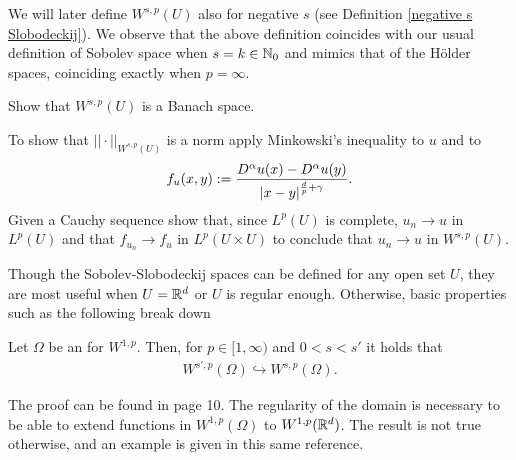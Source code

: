 \documentclass[
    a4paper,
    DIV=14,
    abstract=true,
    numbers=noenddot
]{scrartcl}
\begin{document}
We will later define $W^{s,p}(U)$ also for negative $s$ (see Definition \ref{negative s Slobodeckij}). We observe that the above definition coincides with our usual definition of Sobolev space when $s=k \in \mathbb{N}_0$ and mimics that of the H\"older spaces, coinciding exactly when $p=\infty$.
\begin{exercise}
    Show that $W^{s,p}(U)$ is a Banach space.
\end{exercise}
\begin{hint}
    To show that $|| \cdot ||_{W^{s,p}(U)}$ is a norm apply Minkowski's inequality to $u$ and to
    \begin{align*}
        f_u(x,y):=\frac{D^\alpha u(x)-D^\alpha u(y)}{{\left| x-y \right|}^{\frac{d}{p}+\gamma}}.
    \end{align*}
    Given a Cauchy sequence show that, since $L^p(U)$ is complete, $u_n \to u$ in $L^p(U)$ and that $f_{u_n} \to f_u$ in $L^p(U\times U)$ to conclude that $u_n \to u$ in $W^{s,p}(U)$.
\end{hint}
Though the Sobolev-Slobodeckij spaces can be defined for any open set $U$, they are most useful when $U=\mathbb{R}^d$ or $U$  is regular enough. Otherwise, basic properties such as the following break down
\begin{proposition}\label{inclusion ordered by regularity}
    Let  $\Omega$ be an  for $W^{1,p}$.  Then, for $p \in [1,\infty)$ and $0<s<s'$ it holds that
    \begin{align*}
        W^{s',p}(\Omega )\hookrightarrow W^{s,p}(\Omega ).
    \end{align*}
\end{proposition}
The proof can be found in \cite{di2012hitchhikers} page 10. The regularity of the domain is necessary to be able to extend functions in $W^{1,p}(\Omega )$ to $W^{1,p}(\mathbb{R}^d)$. The result is not true otherwise, and an example is given in this same reference.
\end{document}
